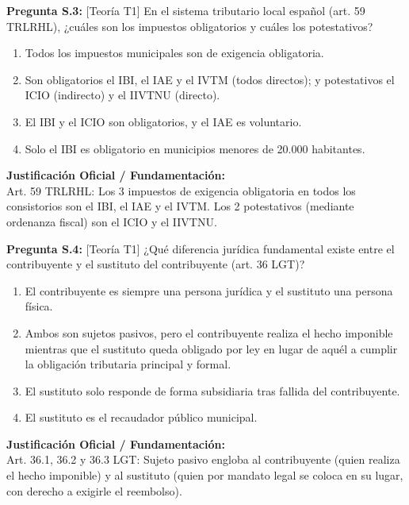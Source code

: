 \documentclass[11pt,a4paper,openany]{article}
\begin{document}
\noindent\textbf{\sffamily Pregunta S.3:} [Teoría T1] En el sistema tributario local español (art. 59 TRLRHL), ¿cuáles son los impuestos obligatorios y cuáles los potestativos?\\[0.15cm]
\begin{enumerate}[label=\textbf{\alph*)},leftmargin=1.8em,itemsep=1.5pt,topsep=2pt,partopsep=0pt,parsep=0pt]
    \item Todos los impuestos municipales son de exigencia obligatoria.
    \item Son obligatorios el IBI, el IAE y el IVTM (todos directos); y potestativos el ICIO (indirecto) y el IIVTNU (directo).
    \item El IBI y el ICIO son obligatorios, y el IAE es voluntario.
    \item Solo el IBI es obligatorio en municipios menores de 20.000 habitantes.
\end{enumerate}
\begin{solucionBox}
\textbf{Justificación Oficial / Fundamentación:}\\[0.1cm]
Art. 59 TRLRHL: Los 3 impuestos de exigencia obligatoria en todos los consistorios son el IBI, el IAE y el IVTM. Los 2 potestativos (mediante ordenanza fiscal) son el ICIO y el IIVTNU.
\end{solucionBox}
\vspace{0.35cm}

\noindent\textbf{\sffamily Pregunta S.4:} [Teoría T1] ¿Qué diferencia jurídica fundamental existe entre el contribuyente y el sustituto del contribuyente (art. 36 LGT)?\\[0.15cm]
\begin{enumerate}[label=\textbf{\alph*)},leftmargin=1.8em,itemsep=1.5pt,topsep=2pt,partopsep=0pt,parsep=0pt]
    \item El contribuyente es siempre una persona jurídica y el sustituto una persona física.
    \item Ambos son sujetos pasivos, pero el contribuyente realiza el hecho imponible mientras que el sustituto queda obligado por ley en lugar de aquél a cumplir la obligación tributaria principal y formal.
    \item El sustituto solo responde de forma subsidiaria tras fallida del contribuyente.
    \item El sustituto es el recaudador público municipal.
\end{enumerate}
\begin{solucionBox}
\textbf{Justificación Oficial / Fundamentación:}\\[0.1cm]
Art. 36.1, 36.2 y 36.3 LGT: Sujeto pasivo engloba al contribuyente (quien realiza el hecho imponible) y al sustituto (quien por mandato legal se coloca en su lugar, con derecho a exigirle el reembolso).
\end{solucionBox}
\vspace{0.35cm}
\end{document}
